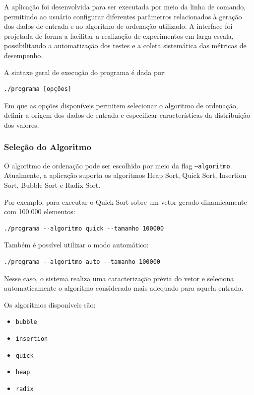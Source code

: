 \documentclass{article}
\begin{document}
A aplicação foi desenvolvida para ser executada por meio da linha de comando, permitindo ao usuário configurar diferentes parâmetros relacionados à geração dos dados de entrada e ao algoritmo de ordenação utilizado. 
A interface foi projetada de forma a facilitar a realização de experimentos em larga escala, possibilitando a automatização dos testes e a coleta sistemática das métricas de desempenho.

A sintaxe geral de execução do programa é dada por:

\begin{verbatim}
./programa [opções]
\end{verbatim}

Em que as opções disponíveis permitem selecionar o algoritmo de ordenação, definir a origem dos dados de entrada e especificar características da distribuição dos valores.

\subsubsection{Seleção do Algoritmo}

O algoritmo de ordenação pode ser escolhido por meio da flag \texttt{--algoritmo}. 
Atualmente, a aplicação suporta os algoritmos Heap Sort, Quick Sort, Insertion Sort, Bubble Sort e Radix Sort.

Por exemplo, para executar o Quick Sort sobre um vetor gerado dinamicamente com 100.000 elementos:

\begin{verbatim}
./programa --algoritmo quick --tamanho 100000
\end{verbatim}

Também é possível utilizar o modo automático:

\begin{verbatim}
./programa --algoritmo auto --tamanho 100000
\end{verbatim}

Nesse caso, o sistema realiza uma caracterização prévia do vetor e seleciona automaticamente o algoritmo considerado mais adequado para aquela entrada.

Os algoritmos disponíveis são:

\begin{itemize}
    \item \texttt{bubble}
    \item \texttt{insertion}
    \item \texttt{quick}
    \item \texttt{heap}
    \item \texttt{radix}
\end{itemize}
\end{document}
